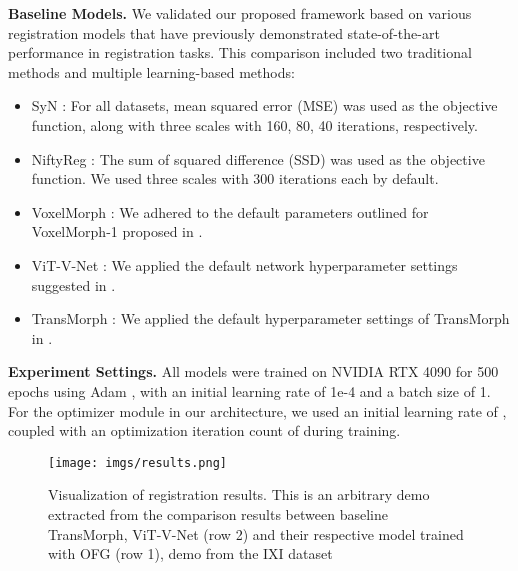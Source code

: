 \documentclass[10pt,twocolumn,letterpaper]{article}
\begin{document}
\textbf{Baseline Models.} We validated our proposed framework based on various registration models that have previously demonstrated state-of-the-art performance in registration tasks. This comparison included two traditional methods and multiple learning-based methods:
\begin{itemize}
    \item SyN \cite{AVANTS200826}: For all datasets, mean squared error (MSE) was used as the objective function, along with three scales with 160, 80, 40 iterations, respectively.
    \item NiftyReg \cite{niftyreg}: The sum of squared difference (SSD) was used as the objective function. We used three scales with 300 iterations each by default.
    \item VoxelMorph \cite{Balakrishnan_2019}: We adhered to the default parameters outlined for VoxelMorph-1 proposed in \cite{Balakrishnan_2019}.
    \item ViT-V-Net \cite{chen2021vitvnet}: We applied the default network hyperparameter settings suggested in \cite{chen2021vitvnet}.
    \item TransMorph \cite{Chen_2022}: We applied the default hyperparameter settings of TransMorph in \cite{Chen_2022}.
\end{itemize}

\textbf{Experiment Settings.} All models were trained on NVIDIA RTX 4090 for 500 epochs using Adam \cite{adam2014arx}, with an initial learning rate of 1e-4 and a batch size of 1. 
For the optimizer module in our architecture, we used an initial learning rate of , coupled with an optimization iteration count of  during training.























\begin{figure*}[t]
    \label{fig:results}
    \begin{center}
       \texttt{[image: imgs/results.png]}
    \end{center}
    \caption{Visualization of registration results. This is an arbitrary demo extracted from the comparison results between baseline TransMorph, ViT-V-Net (row 2) and their respective model trained with OFG (row 1), demo from the IXI dataset \cite{ixi}}
    \label{fig:vis-results}
\end{figure*}
\end{document}
